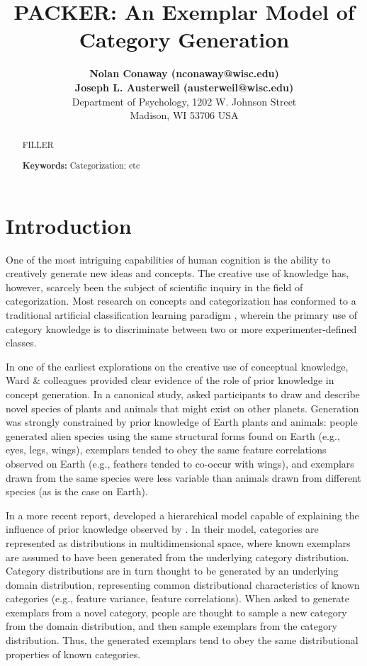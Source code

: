 \documentclass[10pt,letterpaper]{article}
\title{PACKER: An Exemplar Model of Category Generation}
\author{
{ \large \bf Nolan Conaway (nconaway@wisc.edu) } \\
{ \large \bf Joseph L. Austerweil (austerweil@wisc.edu) } \\
Department of Psychology, 1202 W. Johnson Street \\
Madison, WI 53706 USA
}
\begin{document}
\maketitle

\begin{abstract}
FILLER

\textbf{Keywords:} 
Categorization; etc
\end{abstract}

\section{Introduction}

One of the most intriguing capabilities of human cognition is the ability to creatively generate new ideas and concepts. %
The creative use of knowledge has, however, scarcely been the subject of scientific inquiry in the field of categorization. Most research on concepts and categorization has conformed to a traditional artificial classification learning paradigm \citep{kurtz2015human}, wherein the primary use of category knowledge is to discriminate between two or more experimenter-defined classes.

In one of the earliest explorations on the creative use of conceptual knowledge, Ward \& colleagues \citep{marsh1999inadvertent,smith1993constraining,ward2002role,ward1994structured} provided clear evidence of the role of prior knowledge in concept generation. In a canonical study, \citet{ward1994structured} asked participants to draw and describe novel species of plants and animals that might exist on other planets. Generation was strongly constrained by prior knowledge of Earth plants and animals: people generated alien species using the same structural forms found on Earth (e.g., eyes, legs, wings), exemplars tended to obey the same feature correlations observed on Earth (e.g., feathers tended to co-occur with wings), and exemplars drawn from the same species were less variable than animals drawn from different species (as is the case on Earth). 


In a more recent report, \citet{jern2013probabilistic} developed a hierarchical model capable of explaining the influence of prior knowledge observed by \citet{ward1994structured}. In their model, categories are represented as distributions in multidimensional space, where known exemplars are assumed to have been generated from the underlying category distribution. Category distributions are in turn thought to be generated by an underlying domain distribution, representing common distributional characteristics of known categories (e.g., feature variance, feature correlations). When asked to generate exemplars from a novel category, people are thought to sample a new category from the domain distribution, and then sample exemplars from the category distribution. Thus, the generated exemplars tend to obey the same distributional properties of known categories. 
\end{document}
